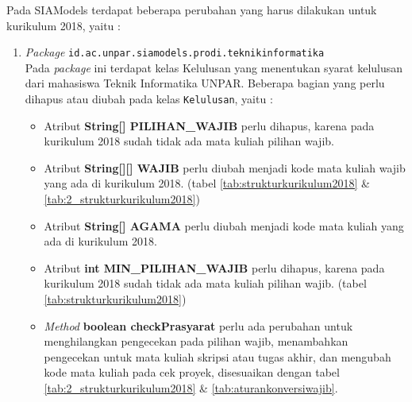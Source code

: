 Pada SIAModels terdapat beberapa perubahan yang harus dilakukan untuk kurikulum 2018, yaitu :
\begin{enumerate}
	\item \textit{Package} \texttt{id.ac.unpar.siamodels.prodi.teknikinformatika}\\
	Pada \textit{package} ini terdapat kelas Kelulusan yang menentukan syarat kelulusan dari mahasiswa Teknik Informatika UNPAR. Beberapa bagian yang perlu dihapus atau diubah pada kelas \texttt{Kelulusan}, yaitu :
	\begin{itemize}
		\item Atribut \textbf{String[] PILIHAN\_WAJIB} perlu dihapus, karena pada kurikulum 2018 sudah tidak ada mata kuliah pilihan wajib.
		\item Atribut \textbf{String[][] WAJIB} perlu diubah menjadi kode mata kuliah wajib yang ada di kurikulum 2018. (tabel \ref{tab:strukturkurikulum2018} \& \ref{tab:2_strukturkurikulum2018})
		\item Atribut \textbf{String[] AGAMA} perlu diubah menjadi kode mata kuliah yang ada di kurikulum 2018.
		\item Atribut \textbf{int MIN\_PILIHAN\_WAJIB} perlu dihapus, karena pada kurikulum 2018 sudah tidak ada mata kuliah pilihan wajib. (tabel \ref{tab:strukturkurikulum2018})
		\item \textit{Method} \textbf{boolean checkPrasyarat} perlu ada perubahan untuk menghilangkan pengecekan pada pilihan wajib, menambahkan pengecekan untuk mata kuliah skripsi atau tugas akhir, dan mengubah kode mata kuliah pada cek proyek, disesuaikan dengan tabel \ref{tab:2_strukturkurikulum2018} \& \ref{tab:aturankonversiwajib}.
	\end{itemize}
		

\end{enumerate}
